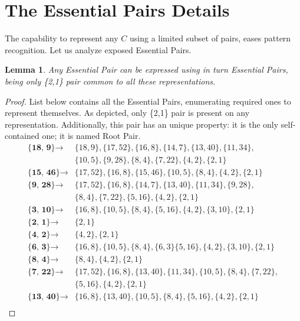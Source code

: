 \documentclass{jams-l}
\newtheorem{lemma}[theorem]{Lemma}
\theoremstyle{definition}
\theoremstyle{remark}
\numberwithin{equation}{section}
\begin{document}
    \section{The Essential Pairs Details}
    	The capability to represent any $C$ using a limited subset of pairs, eases pattern recognition. Let us analyze exposed Essential Pairs.
    	\begin{lemma}
    		Any Essential Pair can be expressed using in turn Essential Pairs, being only \{2,1\} pair common to all these representations.
    	\end{lemma}
    	\begin{proof}
    		List below contains all the Essential Pairs, enumerating required ones to represent themselves. As depicted, only \{2,1\} pair is present on any representation. Additionally, this pair has an unique property: it is the only self-contained one; it is named Root Pair.
    		\begin{align}
    			\textbf{\{18, 9\}} \rightarrow &\{18, 9\},\{17, 52\},\{16, 8\},\{14, 7\},\{13, 40\},\{11, 34\},\\ \nonumber &\{10, 5\},\{9, 28\},\{8, 4\},\{7, 22\},\{4, 2\},\{2, 1\}\\
                \textbf{\{15, 46\}} \rightarrow &\{17, 52\},\{16, 8\},\{15, 46\},\{10, 5\},\{8, 4\},\{4, 2\},\{2, 1\}\\
       			\textbf{\{9, 28\}} \rightarrow &\{17, 52\},\{16, 8\},\{14, 7\},\{13, 40\},\{11, 34\},\{9, 28\},\\ \nonumber &\{8, 4\},\{7, 22\},\{5, 16\},\{4, 2\},\{2, 1\}\\
                \textbf{\{3, 10\}} \rightarrow &\{16, 8\},\{10, 5\},\{8, 4\},\{5, 16\},\{4, 2\},\{3, 10\},\{2, 1\}\\
                \textbf{\{2, 1\}} \rightarrow &\{2, 1\}\\
                \textbf{\{4, 2\}} \rightarrow &\{4, 2\},\{2, 1\}\\
                \textbf{\{6, 3\}} \rightarrow &\{16, 8\},\{10, 5\},\{8, 4\},\{6, 3\}\{5, 16\},\{4, 2\},\{3,10\},\{2, 1\}\\
                \textbf{\{8, 4\}} \rightarrow &\{8, 4\},\{4, 2\},\{2, 1\}\\
                \textbf{\{7, 22\}} \rightarrow &\{17, 52\},\{16, 8\},\{13, 40\},\{11, 34\},\{10, 5\},\{8, 4\},\{7, 22\},\\ \nonumber &\{5, 16\},\{4, 2\},\{2, 1\}\\
                \textbf{\{13, 40\}} \rightarrow &\{16, 8\},\{13, 40\},\{10, 5\},\{8, 4\},\{5, 16\},\{4, 2\},\{2, 1\}\\

\end{align}
\end{proof}
\end{document}
